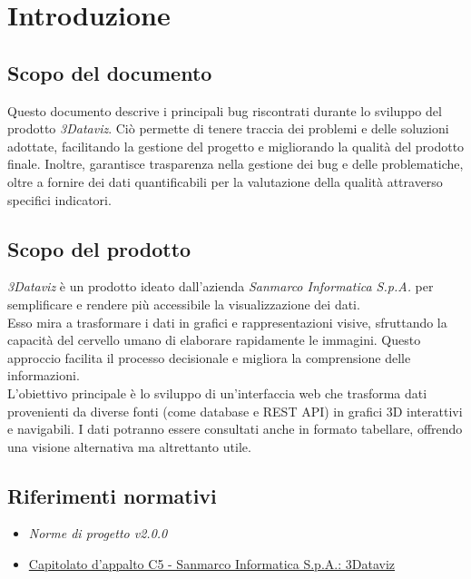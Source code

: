 \section{Introduzione}
\subsection{Scopo del documento}
Questo documento descrive i principali bug riscontrati durante lo sviluppo del prodotto \textit{3Dataviz}.
Ciò permette di tenere traccia dei problemi e delle soluzioni adottate, facilitando la gestione del progetto e migliorando la qualità del prodotto finale.
Inoltre, garantisce trasparenza nella gestione dei bug e delle problematiche, oltre a fornire dei dati quantificabili per la valutazione della qualità 
attraverso specifici indicatori.

\subsection{Scopo del prodotto}
\textit{3Dataviz} è un prodotto ideato dall'azienda \textit{Sanmarco Informatica S.p.A.} per semplificare e rendere più accessibile la visualizzazione dei dati.\\
Esso mira a trasformare i dati in grafici e rappresentazioni visive, sfruttando la capacità del cervello umano di elaborare rapidamente le immagini. 
Questo approccio facilita il processo decisionale e migliora la comprensione delle informazioni.\\
L’obiettivo principale è lo sviluppo di un’interfaccia web che trasforma dati provenienti da diverse fonti (come database e REST API) in grafici 3D interattivi e navigabili. 
I dati potranno essere consultati anche in formato tabellare, offrendo una visione alternativa ma altrettanto utile.  

\subsection{Riferimenti normativi}
\begin{itemize}
      \item {\textit{Norme di progetto v2.0.0}}
      \item \href{https://www.math.unipd.it/~tullio/IS-1/2024/Progetto/C5.pdf}
            {Capitolato d'appalto C5 - Sanmarco Informatica S.p.A.: 3Dataviz}
\end{itemize}
